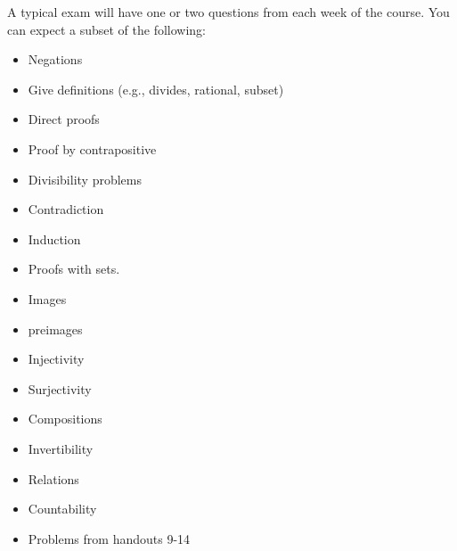 \documentclass[12pt]{article}
\begin{document}
A typical exam will have one or two questions from each week of the course. You can expect a subset of the following:
\begin{itemize}
\item Negations
\item Give definitions (e.g., divides, rational, subset)
\item Direct proofs
\item Proof by contrapositive
\item Divisibility problems
\item Contradiction
\item Induction
\item Proofs with sets. 
\item Images
\item preimages
\item Injectivity 
\item Surjectivity
\item Compositions
\item Invertibility
\item Relations
\item Countability
\item Problems from handouts 9-14
\end{itemize}




 
\end{document}
